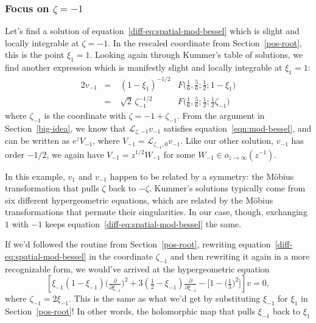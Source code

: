 \documentclass{article}
\theoremstyle{plain}
\newcommand{\laplace}{\mathcal{L}}
\begin{document}
\subsubsection{Focus on $\zeta = -1$}\label{neg-root}
Let's find a solution of equation~\ref{diff-eq:spatial-mod-bessel} which is slight and locally integrable at $\zeta = -1$. In the rescaled coordinate from Section~\ref{pos-root}, this is the point $\xi_1 = 1$. Looking again through Kummer's table of solutions, we find another expression \cite[formula~15.10.14]{dlmf} which is manifestly slight and locally integrable at $\xi_1 = 1$:
\begin{alignat*}{2}
v_{-1} &=\;& (1-\xi_1)^{-1/2} & F\big(\tfrac{1}{6}, \tfrac{5}{6}; \tfrac{1}{2}; 1-\xi_1\big) \\
&=\;& \sqrt{2}\,\zeta_{-1}^{-1/2} & F\big(\tfrac{1}{6}, \tfrac{5}{6}; \tfrac{1}{2}; \tfrac{1}{2}\zeta_{-1}\big)
\end{alignat*}
where $\zeta_{-1}$ is the coordinate with $\zeta = -1 + \zeta_{-1}$. From the argument in Section~\ref{big-idea}, we know that $\laplace_{\zeta, -1} v_{-1}$ satisfies equation~\ref{eqn:mod-bessel}, and can be written as $e^z V_{-1}$, where $V_{-1} = \laplace_{\zeta_{-1}, 0} v_{-1}$. Like our other solution, $v_{-1}$ has order $-1/2$, we again have $V_{-1} = z^{1/2} W_{-1}$ for some $W_{-1} \in o_{z \to \infty}(z^{-1})$.

In this example, $v_1$ and $v_{-1}$ happen to be related by a symmetry: the M\"{o}bius transformation that pulls $\zeta$ back to $-\zeta$. Kummer's solutions typically come from six different hypergeometric equations, which are related by the M\"{o}bius transformations that permute their singularities. In our case, though, exchanging $1$ with $-1$ keeps equation~\ref{diff-eq:spatial-mod-bessel} the same.

\color{magenta}
If we'd followed the routine from Section~\ref{pos-root}, rewriting equation~\ref{diff-eq:spatial-mod-bessel} in the coordinate $\zeta_{-1}$ and then rewriting it again in a more recognizable form, we would've arrived at the hypergeometric equation
\[ \left[\xi_{-1} (1 - \xi_{-1}) \big(\tfrac{\partial}{\partial \xi_{-1}}\big)^2 + 3(\tfrac{1}{2} - \xi_{-1}) \tfrac{\partial}{\partial \xi_{-1}} - \big[1 - \big(\tfrac{1}{3}\big)^2\big]\right] v = 0, \]
where $\zeta_{-1} = 2\xi_{-1}$. This is the same as what we'd get by substituting $\xi_{-1}$ for $\xi_1$ in Section~\ref{pos-root}! In other words, the holomorphic map that pulls $\xi_{-1}$ back to $\xi_1$
\color{black}
\color{violet}
\end{document}
